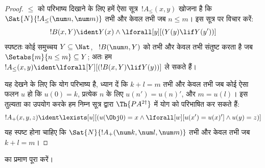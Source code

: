 \documentclass[../../../include/open-logic-section]{subfiles}
\begin{document}
\begin{proof}
$\le$ को परिभाष्य दिखाने के लिए हमें ऐसा सूत्र~$!A_\le(x, y)$ खोजना है कि
$\Sat{N}{!A_\le(\num n, \num m)}$ तभी और केवल तभी जब $n \le m$। इस सूत्र
पर विचार करें:
\[
!B(x, Y) \ident Y(x) \land \lforall[y][(Y(y) \lif Y(y'))]
\]
स्पष्टतः कोई समुच्चय $Y \subseteq \Nat$, ~$!B(\num n, Y)$ को तभी और केवल
तभी संतुष्ट करता है जब $\Setabs{m}{n \le m} \subseteq Y$; अतः हम
$!A_\le(x, y) \ident \lforall[Y][(!B(x, Y) \lif Y(y))]$ ले सकते हैं।

यह देखने के लिए कि योग परिभाष्य है, ध्यान दें कि $k+l=m$ तभी और केवल तभी
जब कोई ऐसा फलन $u$ हो कि $u(0)=k$, प्रत्येक $n$ के लिए $u(n')=u(n)'$, और
$m = u(l)$। इस तुल्यता का उपयोग करके हम निम्न सूत्र द्वारा
$\Th{PA^{2\dagger}}$ में योग को परिभाषित कर सकते हैं:
\[
!A_+(x,y,z) \ident \lexists[u][(u(\Obj 0)=x \land \lforall[w][u(x')=u
 (x)'] \land u(y)=z)]
\] 
यह स्पष्ट होना चाहिए कि $\Sat{N}{!A_+(\num k, \num l, \num m)}$ तभी और
केवल तभी जब $k+l=m$।
\end{proof}

\begin{prob}
 का प्रमाण पूरा करें।
\end{prob}
\end{document}
